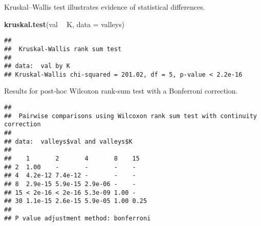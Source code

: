 \documentclass[]{book}
\newenvironment{Shaded}{\begin{snugshade}}{\end{snugshade}}
\newcommand{\DataTypeTok}[1]{\textcolor[rgb]{0.13,0.29,0.53}{#1}}
\newcommand{\KeywordTok}[1]{\textcolor[rgb]{0.13,0.29,0.53}{\textbf{#1}}}
\newcommand{\NormalTok}[1]{#1}
\newcommand{\OperatorTok}[1]{\textcolor[rgb]{0.81,0.36,0.00}{\textbf{#1}}}
\newcommand{\OtherTok}[1]{\textcolor[rgb]{0.56,0.35,0.01}{#1}}
\newcommand{\StringTok}[1]{\textcolor[rgb]{0.31,0.60,0.02}{#1}}
\begin{document}
Kruskal--Wallis test illustrates evidence of statistical differences.

\begin{Shaded}
\begin{Highlighting}[]
\KeywordTok{kruskal.test}\NormalTok{(val }\OperatorTok{~}\StringTok{ }\NormalTok{K, }\DataTypeTok{data =}\NormalTok{ valleys)}
\end{Highlighting}
\end{Shaded}

\begin{verbatim}
## 
##  Kruskal-Wallis rank sum test
## 
## data:  val by K
## Kruskal-Wallis chi-squared = 201.02, df = 5, p-value < 2.2e-16
\end{verbatim}

Results for post-hoc Wilcoxon rank-sum test with a Bonferroni correction.

\begin{Shaded}
\end{Shaded}

\begin{verbatim}
## 
##  Pairwise comparisons using Wilcoxon rank sum test with continuity correction 
## 
## data:  valleys$val and valleys$K 
## 
##    1       2       4       8    15  
## 2  1.00    -       -       -    -   
## 4  4.2e-12 7.4e-12 -       -    -   
## 8  2.9e-15 5.9e-15 2.9e-06 -    -   
## 15 < 2e-16 < 2e-16 5.3e-09 1.00 -   
## 30 1.1e-15 2.6e-15 5.9e-05 1.00 0.25
## 
## P value adjustment method: bonferroni
\end{verbatim}
\end{document}

